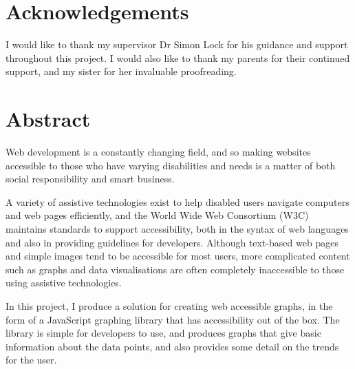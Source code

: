 \documentclass[ %
                    author={Aleena Baig},
                supervisor={Dr Simon Lock},
                    degree={BSc},
                     title={On Making Web Accessible Graphs},
                  subtitle={},
                      year={2019} ]{dissertation}
\begin{document}
\frontmatter


\makedecl

\chapter*{Acknowledgements}

I would like to thank my supervisor Dr Simon Lock for his guidance and support throughout this project. I would also like to thank my parents for their continued support, and my sister for her invaluable proofreading.

\chapter*{Abstract}

Web development is a constantly changing field, and so making websites accessible to those who have varying disabilities and needs is a matter of both social responsibility and smart business.

A variety of assistive technologies exist to help disabled users navigate computers and web pages efficiently, and the World Wide Web Consortium (W3C) maintains standards to support accessibility, both in the syntax of web languages and also in providing guidelines for developers. Although text-based web pages and simple images tend to be accessible for most users, more complicated content such as graphs and data visualisations are often completely inaccessible to those using assistive technologies.

In this project, I produce a solution for creating web accessible graphs, in the form of a JavaScript graphing library that has accessibility out of the box. The library is simple for developers to use, and produces graphs that give basic information about the data points, and also provides some detail on the trends for the user.

\tableofcontents


\mainmatter

\setlength{\parskip}{1em}
\end{document}
